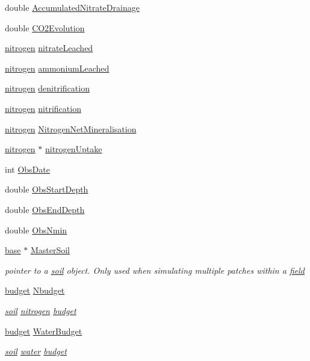\begin{DoxyCompactItemize}
double \hyperlink{classsoil_a92ba9cb92d2aebff24c21437ced70017}{AccumulatedNitrateDrainage}
\item 
double \hyperlink{classsoil_aca4597213bffd5e97041c7da8b41f009}{CO2Evolution}
\item 
\hyperlink{classnitrogen}{nitrogen} \hyperlink{classsoil_a6d11057be5710fe4f12a148abccc30eb}{nitrateLeached}
\item 
\hyperlink{classnitrogen}{nitrogen} \hyperlink{classsoil_ad38099a7fb0f61aa85c082b4aa0ed931}{ammoniumLeached}
\item 
\hyperlink{classnitrogen}{nitrogen} \hyperlink{classsoil_ab94851a74389f879a38bdcaad1826ef2}{denitrification}
\item 
\hyperlink{classnitrogen}{nitrogen} \hyperlink{classsoil_a9b86d97fc4356ee0b07bbb78f67484c8}{nitrification}
\item 
\hyperlink{classnitrogen}{nitrogen} \hyperlink{classsoil_a7bd29a49ff933e84c22b9fe2753cc2fe}{NitrogenNetMineralisation}
\item 
\hyperlink{classnitrogen}{nitrogen} $\ast$ \hyperlink{classsoil_a738126f478188eb4e5ec2b04271c6d6d}{nitrogenUptake}
\item 
int \hyperlink{classsoil_ab7b370d76922228a0a9dafd5ac949e2c}{ObsDate}
\item 
double \hyperlink{classsoil_a734188a32db436bc619cc47045a68644}{ObsStartDepth}
\item 
double \hyperlink{classsoil_ad656120ed527bb7465e4283d759a1458}{ObsEndDepth}
\item 
double \hyperlink{classsoil_a9a7b5cf3ce4d580e34a017560dae7749}{ObsNmin}
\item 
\hyperlink{classbase}{base} $\ast$ \hyperlink{classsoil_acb896799bb21079bd5adf7ae8432c958}{MasterSoil}
\begin{DoxyCompactList}\small\item\em pointer to a \hyperlink{classsoil}{soil} object. Only used when simulating multiple patches within a \hyperlink{classfield}{field} \item\end{DoxyCompactList}\item 
\hyperlink{classbudget}{budget} \hyperlink{classsoil_addf9abd98e1b4678c37c714b49045f79}{Nbudget}
\begin{DoxyCompactList}\small\item\em \hyperlink{classsoil}{soil} \hyperlink{classnitrogen}{nitrogen} \hyperlink{classbudget}{budget} \item\end{DoxyCompactList}\item 
\hyperlink{classbudget}{budget} \hyperlink{classsoil_a5fc83b89b81299ab7cde864a78092279}{WaterBudget}
\begin{DoxyCompactList}\small\item\em \hyperlink{classsoil}{soil} \hyperlink{classwater}{water} \hyperlink{classbudget}{budget} \item\end{DoxyCompactList}\end{DoxyCompactItemize}


